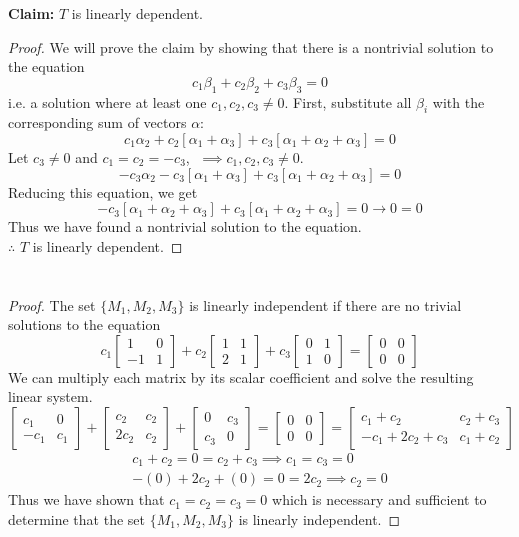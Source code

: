 \documentclass[]{article}
\newcommand{\bmat}[1]{\begin{bmatrix}#1\end{bmatrix}}
\begin{document}
\textbf{Claim:} $T$ is linearly dependent.
\begin{proof}
	We will prove the claim by showing that there is a nontrivial solution to the equation
	\[ c_1\beta_1 + c_2\beta_2 + c_3\beta_3 = 0 \]
	i.e. a solution where at least one $c_1, c_2, c_3 \neq 0$. First, substitute all $\beta_i$ with the corresponding sum of vectors $\alpha$:
	\[ c_1\alpha_2 + c_2[\alpha_1 + \alpha_3] + c_3[\alpha_1 + \alpha_2 + \alpha_3] = 0 \]
	Let $c_3 \neq 0$ and $c_1 = c_2 = -c_3$, $\; \implies c_1,c_2,c_3 \neq 0$.
	\[ -c_3\alpha_2 - c_3[\alpha_1 + \alpha_3] + c_3[\alpha_1 + \alpha_2 + \alpha_3] = 0\]
	Reducing this equation, we get
	\[ -c_3[\alpha_1 + \alpha_2 + \alpha_3] + c_3[\alpha_1 + \alpha_2 + \alpha_3] = 0 \longrightarrow 0 = 0\]
	Thus we have found a nontrivial solution to the equation.\\
	$\therefore$ $T$ is linearly dependent.
\end{proof}
\section{}
\subsection{}
\begin{proof}
The set $\{M_1, M_2, M_3\}$ is linearly independent if there are no trivial solutions to the equation
\begin{equation}
	c_1\bmat{1&0\\-1&1} + c_2\bmat{1&1\\2&1} + c_3\bmat{0&1\\1&0} = \bmat{0&0\\0&0}
\end{equation}
	We can multiply each matrix by its scalar coefficient and solve the resulting linear system.
	\[ \bmat{c_1&0\\-c_1&c_1} + \bmat{c_2&c_2\\2c_2&c_2} + \bmat{0&c_3\\c_3&0} = \bmat{0&0\\0&0} = \bmat{c_1+c_2 & c_2+c_3 \\ -c_1 + 2c_2 + c_3&c_1 + c_2} \] 
	\begin{align}
		c_1 + c_2 = 0 = c_2 + c_3 \implies c_1 = c_3 = 0\\
		-(0) + 2c_2 + (0) = 0 = 2c_2 \implies c_2 = 0
	\end{align}
	Thus we have shown that $c_1 = c_2 = c_3 = 0$ which is necessary and sufficient to determine that the set $\{M_1, M_2, M_3\}$ is linearly independent.
\end{proof}
\end{document}
